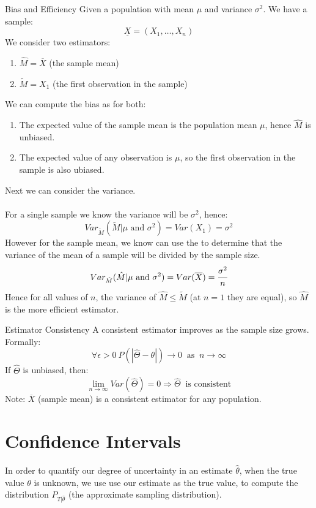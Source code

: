 \begin{examplebox}{Bias and Efficiency}
	Given a population with mean $\mu$ and variance $\sigma^2$. We have a sample:
	\[\underline{X} = (X_1, \dots, X_n)\]
	We consider two estimators:
	\begin{enumerate}
		\item $\hat{M} = \overline{X}$ (the sample mean)
		\item $\tilde{M} = X_1$ (the first observation in the sample)
    \end{enumerate}
	We can compute the bias as for both:
	\begin{enumerate}
		\item The expected value of the sample mean is the population mean $\mu$, hence $\hat{M}$ is unbiased.
		\item The expected value of any observation is $\mu$, so the first observation in the sample is also ubiased.
	\end{enumerate}
	Next we can consider the variance.
	\\
	\\ For a single sample we know the variance will be $\sigma^2$, hence:
	\[Var_{\tilde{M}}(\tilde{M}|\mu \text{ and } \sigma^2) = Var(X_1) = \sigma^2\]
	However for the sample mean, we know can use the  to determine that the variance of the mean of a sample will be divided by the sample size.
	\[Var_{\hat{M}}(\hat{M}|\mu \text{ and } \sigma^2) = Var(\overline{X}) = \cfrac{\sigma^2}{n}\]
	Hence for all values of $n$, the variance of $\hat{M} \leq \tilde{M}$ (at $n=1$ they are equal), so $\hat{M}$ is the more efficient estimator.
\end{examplebox}
\begin{definitionbox}{Estimator Consistency}
	A consistent estimator improves as the sample size grows. Formally:
	\[\forall \epsilon > 0 \ P(|\hat{\Theta} - \theta|) \to 0 \ \text{ as } \ n \to \infty\]
	If $\hat{\Theta}$ is unbiased, then:
	\[\lim_{n \to \infty} Var(\hat{\Theta}) = 0 \Rightarrow \hat{\Theta} \ \text{ is consistent}\]
	Note: $\overline{X}$ (sample mean) is a consistent estimator for any population.
\end{definitionbox}
\section{Confidence Intervals}
In order to quantify our degree of uncertainty in an estimate $\hat{\theta}$, when the true value $\theta$ is unknown, we use use our estimate as the true value, to compute the distribution $P_{T|\hat{\theta}}$ (the approximate sampling distribution).
